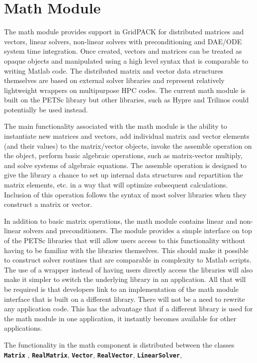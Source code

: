 \section{Math Module}

The math module provides support in GridPACK for distributed matrices
and vectors, linear solvers, non-linear solvers with preconditioning
and DAE/ODE system time integration. Once created, vectors and matrices can be treated as opaque objects and manipulated using a high level syntax that is comparable to writing Matlab code. The distributed matrix and vector data structures themselves are based on external solver libraries and represent relatively lightweight wrappers on multipurpose HPC codes. The current math module is built on the PETSc library but other libraries, such as Hypre and Trilinos could potentially be used instead.

The main functionality associated with the math module is the ability to instantiate new matrices and vectors, add individual matrix and vector elements (and their values) to the matrix/vector objects, invoke the assemble operation on the object, perform basic algebraic operations, such as matrix-vector multiply, and solve systems of algebraic equations. The assemble operation is designed to give the library a chance to set up internal data structures and repartition the matrix elements, etc. in a way that will optimize subsequent calculations. Inclusion of this operation follows the syntax of most solver libraries when they construct a matrix or vector. 

In addition to basic matrix operations, the math module contains linear and non-linear solvers and preconditioners. The module provides a simple interface on top of the PETSc libraries that will allow users access to this functionality without having to be familiar with the libraries themselves. This should make it possible to construct solver routines that are comparable in complexity to Matlab scripts. The use of a wrapper instead of having users directly access the libraries will also make it simpler to switch the underlying library in an application. All that will be required is that developers link to an implementation of the math module interface that is built on a different library. There will not be a need to rewrite any application code. This has the advantage that if a different library is used for the math module in one application, it instantly becomes available for other applications.

The functionality in the math component is distributed between the classes \texttt{\textbf{Matrix}} , \texttt{\textbf{RealMatrix}}, \texttt{\textbf{Vector}}, \texttt{\textbf{RealVector}}, \texttt{\textbf{LinearSolver}}, 

